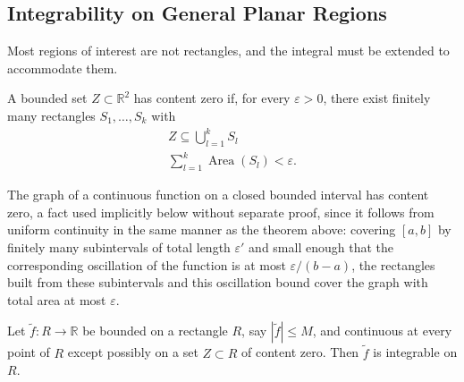 \subsection{Integrability on General Planar Regions}


Most regions of interest are not rectangles, and the integral must be extended to accommodate them.

\begin{definition}
A bounded set $Z \subset \mathbb{R}^2$ has content zero if, for every $\varepsilon>0$, there exist finitely many rectangles $S_1,\dots,S_k$ with
\[
\begin{gathered}
Z \subseteq \bigcup_{l=1}^{k} S_l \\
\sum_{l=1}^{k}\operatorname{Area}(S_l) < \varepsilon.
\end{gathered}
\]

\end{definition}

The graph of a continuous function on a closed bounded interval has content zero, a fact used implicitly below without separate proof, since it follows from uniform continuity in the same manner as the theorem above: covering $[a,b]$ by finitely many subintervals of total length $\varepsilon'$ and small enough that the corresponding oscillation of the function is at most $\varepsilon/(b-a)$, the rectangles built from these subintervals and this oscillation bound cover the graph with total area at most $\varepsilon$.

\begin{theorem}
Let $\tilde{f} : R \to \mathbb{R}$ be bounded on a rectangle $R$, say $|\tilde{f}| \leq M$, and continuous at every point of $R$ except possibly on a set $Z \subset R$ of content zero. Then $\tilde{f}$ is integrable on $R$.
\end{theorem}

